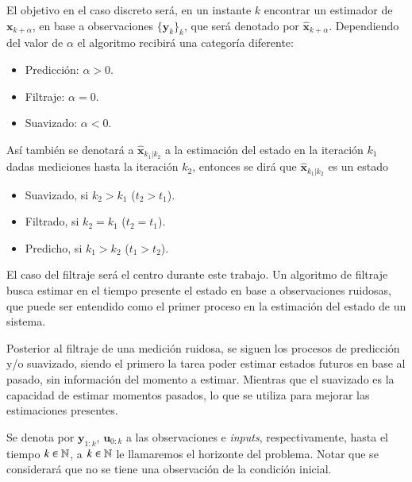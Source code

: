 El objetivo en el caso discreto será, en un instante $k$ encontrar un estimador de $\mathbf{x}_{k+\alpha}$, en base a observaciones $\{\mathbf{y}_k\}_k$, que será denotado por $\hat {\mathbf{x}}_{k+\alpha}$. Dependiendo del valor de $\alpha$ el algoritmo recibirá una categoría diferente:
\begin{itemize}
	\item Predicción: $\alpha > 0$.
	\item Filtraje: $\alpha = 0$.
	\item Suavizado: $\alpha < 0$.
\end{itemize}
Así también se denotará a $\hat {\mathbf{x}}_{k_1|k_2}$ a la estimación del estado en la iteración $k_1$ dadas mediciones hasta la iteración $k_2$, entonces se dirá que $\hat{\mathbf{x}}_{k_1 | k_2}$ es un estado
\begin{itemize}
	\item Suavizado, si $k_2 > k_1$ ($t_2 > t_1$).
	\item Filtrado, si $k_2 = k_1$ ($t_2 = t_1$).
	\item Predicho, si $k_1 > k_2$ ($t_1 > t_2$).
\end{itemize}
El caso del filtraje será el centro durante este trabajo. Un algoritmo de filtraje busca estimar en el tiempo presente el estado en base a observaciones ruidosas, que puede ser entendido como el primer proceso en la estimación del estado de un sistema. 

Posterior al filtraje de una medición ruidosa, se siguen los procesos de predicción y/o suavizado, siendo el primero la tarea poder estimar estados futuros en base al pasado, sin información del momento a estimar. Mientras que el suavizado es la capacidad de estimar momentos pasados, lo que se utiliza para mejorar las estimaciones presentes.

Se denota por $\mathbf{y}_{1:k}$, $\mathbf{u}_{0:k}$ a las observaciones e \textit{inputs}, respectivamente, hasta el tiempo $k \in \mathbb{N}$, a $k \in \mathbb{N}$ le llamaremos el horizonte del problema.  Notar que se considerará que no se tiene una observación de la condición inicial.

